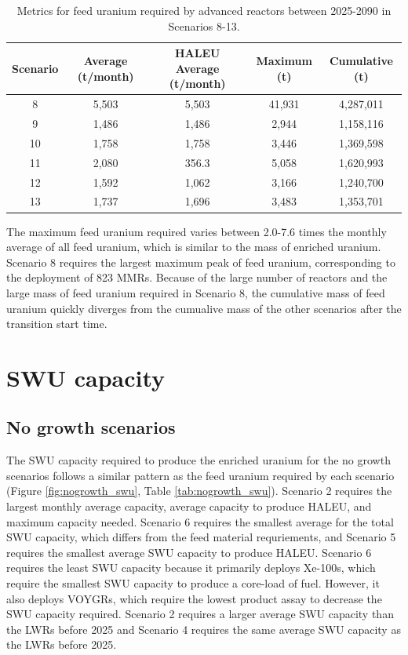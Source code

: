 \begin{table}
    \centering 
    \caption{Metrics for feed uranium required by advanced reactors 
    between 2025-2090 in Scenarios 8-13.}
    \label{tab:1percent_feed}
    \begin{tabular}{c c c c c}
        \hline
        Scenario & Average (t/month) & \gls{HALEU} Average  
        (t/month) & Maximum (t) & Cumulative (t)\\\hline
        8 & 5,503 & 5,503 & 41,931 & 4,287,011\\
        9 & 1,486 & 1,486 & 2,944 & 1,158,116\\
        10 & 1,758 & 1,758 & 3,446 & 1,369,598\\
        11 & 2,080 & 356.3 & 5,058 & 1,620,993\\
        12 & 1,592 & 1,062 & 3,166 & 1,240,700\\
        13 & 1,737 & 1,696 & 3,483 & 1,353,701\\
        \hline
    \end{tabular}
\end{table}

The maximum feed uranium required varies between 2.0-7.6 times the monthly 
average of all feed uranium, which is similar to the 
mass of enriched uranium. Scenario 8 requires the largest maximum peak of 
feed uranium, corresponding to the deployment of 823 \glspl{MMR}. Because 
of 
the large number of reactors and the large mass of feed uranium required 
in Scenario 8, the cumulative mass of feed uranium quickly diverges from 
the cumualive mass of the other scenarios after the transition start time. 

\section{SWU capacity}
\subsection{No growth scenarios}
The \gls{SWU} capacity required to produce the enriched uranium for 
the no growth scenarios follows a similar pattern as 
the feed uranium required by each scenario (Figure \ref{fig:nogrowth_swu}, 
Table \ref{tab:nogrowth_swu}). Scenario 2 requires the largest monthly 
average capacity, average capacity to produce \gls{HALEU}, and maximum 
capacity needed. Scenario 6 requires the smallest average for the total 
\gls{SWU} capacity, which differs from the feed material requriements, 
and Scenario 5 requires the smallest average 
\gls{SWU} capacity to produce \gls{HALEU}. Scenario 6 requires the least 
\gls{SWU} capacity because it primarily deploys Xe-100s, which require the 
smallest \gls{SWU} capacity to produce a core-load of fuel. However, it 
also deploys VOYGRs, which require the lowest product assay to decrease the 
\gls{SWU} capacity required. 
Scenario 2 requires a larger average \gls{SWU} capacity 
than the \glspl{LWR} before 2025 and Scenario 4 requires the same average 
\gls{SWU} capacity as the \glspl{LWR} before 2025. 

